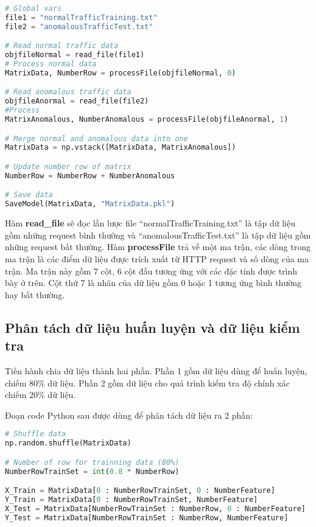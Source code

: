 \documentclass[../main-report.tex]{subfiles}
\begin{document}
\begin{lstlisting}[language=Python]
# Global vars
file1 = "normalTrafficTraining.txt"
file2 = "anomalousTrafficTest.txt"

# Read normal traffic data
objfileNormal = read_file(file1)
# Process normal data
MatrixData, NumberRow = processFile(objfileNormal, 0)

# Read anomalous traffic data
objfileAnormal = read_file(file2)
#Process
MatrixAnomalous, NumberAnomalous = processFile(objfileAnormal, 1)

# Merge normal and anomalous data into one
MatrixData = np.vstack([MatrixData, MatrixAnomalous])

# Update number row of matrix
NumberRow = NumberRow + NumberAnomalous

# Save data
SaveModel(MatrixData, "MatrixData.pkl")
\end{lstlisting}

Hàm \textbf{read\_file} sẽ đọc lần lược file ``normalTrafficTraining.txt''  là tập dữ liệu gồm những request bình thường và  ``anomalousTrafficTest.txt'' là tập dữ liệu gồm những request bất thường. Hàm \textbf{processFile} trả về một ma trận, các dòng trong ma trận là các điểm dữ liệu được trích xuất từ HTTP request và số dòng của ma trận. Ma trận này gồm 7 cột, 6 cột đầu tương ứng với các đặc tính được trình bày ở trên. Cột thứ 7 là nhãn của dữ liệu gồm 0 hoặc 1 tương ứng bình thường hay bất thường.

\subsection{Phân tách dữ liệu huấn luyện và dữ liệu kiểm tra}
Tiến hành chia dữ liệu thành hai phần. Phần 1 gồm dữ liệu dùng để huấn luyện, chiếm 80\% dữ liệu. Phần 2 gồm dữ liệu cho quá trình kiểm tra độ chính xác chiếm 20\% dữ liệu.

Đoạn code Python sau được dùng để phân tách dữ liệu ra 2 phần:

\begin{lstlisting}[language=Python]
# Shuffle data
np.random.shuffle(MatrixData)

# Number of row for trainning data (80%)
NumberRowTrainSet = int(0.8 * NumberRow)

X_Train = MatrixData[0 : NumberRowTrainSet, 0 : NumberFeature]
Y_Train = MatrixData[0 : NumberRowTrainSet, NumberFeature]
X_Test = MatrixData[NumberRowTrainSet : NumberRow, 0 : NumberFeature]
Y_Test = MatrixData[NumberRowTrainSet : NumberRow, NumberFeature]
\end{lstlisting}
\end{document}
